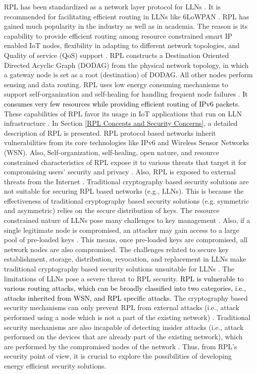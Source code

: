 \documentclass[10pt,journal,sort & compress]{IEEEtran}
\begin{document}
RPL has been standardized as a network layer protocol for LLNs \cite{Iova}. It is recommended for facilitating efficient routing in LLNs like 6LoWPAN \cite{RPLNutshell}. RPL has gained much popularity in the industry as well as in academia. The reason is its capability to provide efficient routing among resource constrained smart IP enabled IoT nodes, flexibility in adapting to different network topologies, and Quality of service (QoS) support \cite{ Granjal, Palattella, Tomic, LLNMobility}. RPL constructs a Destination Oriented Directed Acyclic Graph (DODAG) from the physical network topology, in which a gateway node is set as a root (destination) of DODAG. All other nodes perform sensing and data routing. RPL uses low energy consuming mechanisms to support self-organization and self-healing for handling frequent node failures \cite{ghaleb2018survey}. \textcolor{black}{It consumes very few resources while providing efficient routing of IPv$ 6 $ packets.} These capabilities of RPL favor its usage in IoT applications that run on LLN infrastructure \cite{kharrufa2019rpl}.  In Section \ref{RPL Concepts and Security Concerns}, a detailed description of RPL is presented. RPL protocol based networks inherit vulnerabilities from its core technologies like IPv$ 6 $ and Wireless Sensor Networks (WSN). Also, Self-organization, self-healing, open nature, and resource constrained characteristics of RPL expose it to various threats that target it for compromising users' security and privacy \cite{RIAHISFAR2018118}. Also, RPL is exposed to external threats from the Internet \cite{MendezPY17, grgic2016security}. Traditional cryptography based security solutions are not suitable for securing RPL based networks (e.g., LLNs). This is because the effectiveness of traditional cryptography based security solutions (e.g. symmetric and asymmetric) relies on the secure distribution of keys. The resource constrained nature of LLNs pose many challenges to key management \cite{el2016performance,ilia2013cryptographic}. Also, if a single legitimate node is compromised, an attacker may gain access to a large pool of pre-loaded keys \cite{bechkit2013highly}. This means, once pre-loaded keys are compromised, all network nodes are also compromised. The challenges related to secure key establishment, storage, distribution, revocation, and replacement in LLNs make traditional cryptography based security solutions unsuitable for LLNs \cite{tsao2015security}. The limitations of LLNs pose a severe threat to RPL security. \textcolor{black}{RPL is vulnerable to various routing attacks, which can be broadly classified into two categories, i.e., attacks inherited from WSN, and RPL specific attacks.} The cryptography based security mechanisms can only prevent RPL from external attacks (i.e., attack performed using a node which is not a part of the existing network) \cite{abomhara2015cyber, WCWC052018005.}. Traditional security mechanisms are also incapable of detecting insider attacks (i.e., attack performed on the devices that are already part of the existing network), which are performed by the compromised nodes of the network \cite{Homoliak}. Thus, from RPL's security point of view, it is crucial to explore the possibilities of developing energy efficient security solutions.      
\end{document}
